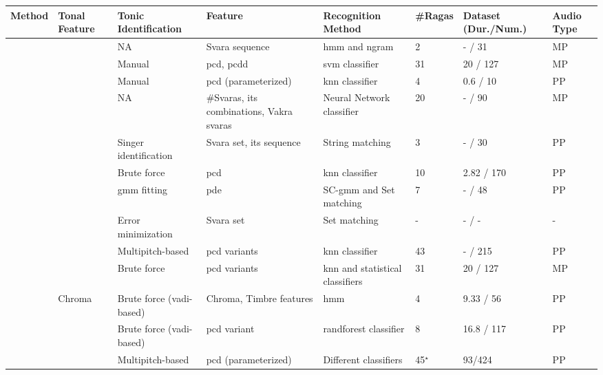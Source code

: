 \begin{table}
	\begin{threeparttable} 
	\scriptsize
		\begin{centering}
			\begin{tabular}{l l P{2cm} P{3cm} P{2.5cm} L{1cm} P{1.5cm} P{.75cm}}
				\hline 
				Method & \textbf{Tonal Feature} & \textbf{Tonic Identification } & \textbf{Feature} & \textbf{Recognition Method} & \textbf{\#Ragas} & \textbf{Dataset (Dur./Num.)} & \textbf{Audio Type}\tabularnewline
				\hline 
				\cite{pandey2003tansen} & \cite{BoersmaPaul2001} & NA & Svara sequence & \acrshort{hmm} and \acrshort{ngram} & 2 & - / 31 & MP\tabularnewline
				\cite{chordia2007raag} & \cite{sun2000pitch} & Manual & \acrshort{pcd}, \acrshort{pcdd} & \acrshort{svm} classifier & 31 & 20 / 127 & MP\tabularnewline
				\cite{belle2009raga} & \cite{rao2009improving} & Manual & \acrshort{pcd} (parameterized) & \acrshort{knn} classifier & 4 & 0.6 / 10 & PP\tabularnewline
				\cite{Shetty2009} & \cite{sridhar_2006_svara} & NA & \#Svaras, its combinations, Vakra svaras & Neural Network classifier & 20 & - / 90 & MP\tabularnewline
				\cite{sridhar2009raga} & \cite{lee2006automatic} & Singer identification & Svara set, its sequence & String matching & 3 & - / 30 & PP\tabularnewline
				\cite{koduri2011survey} & \cite{rao2010vocal} & Brute force & \acrshort{pcd} & \acrshort{knn} classifier & 10 & 2.82 / 170 & PP\tabularnewline
				\cite{ranjani2011carnatic} & \cite{BoersmaPaul2001} & \acrshort{gmm} fitting & \acrshort{pde} & SC-\acrshort{gmm} and Set matching & 7 & - / 48 & PP\tabularnewline
				\cite{chakraborty2012object} & \cite{sengupta1990study} & Error minimization & Svara set & Set matching & - & - / - & -\tabularnewline
				\cite{koduri2012raga} & \cite{Salamon2012} & Multipitch-based & \acrshort{pcd} variants & \acrshort{knn} classifier & 43 & - / 215 & PP\tabularnewline
				\cite{chordia2013joint} & \cite{camacho2007swipe} & Brute force & \acrshort{pcd} variants & \acrshort{knn} and statistical classifiers & 31 & 20 / 127 & MP\tabularnewline
				\cite{dighe2013scale} & Chroma~\citep{lartillot2008matlab} & Brute force (\gls{vadi}-based) & Chroma, Timbre features & \acrshort{hmm}  & 4 & 9.33 / 56 & PP\tabularnewline
				\cite{dighe2013swara} & \citep{lartillot2008matlab} & Brute force (\gls{vadi}-based) & \acrshort{pcd} variant & \acrshort{randforest} classifier & 8 & 16.8 / 117 & PP\tabularnewline
				\cite{koduri2014intonation} & \cite{Salamon2012} & Multipitch-based & \acrshort{pcd} (parameterized)  & Different classifiers & 45{$^\star$} & 93/424 & PP\tabularnewline

\end{tabular}
\end{centering}
\end{threeparttable}
\end{table}
